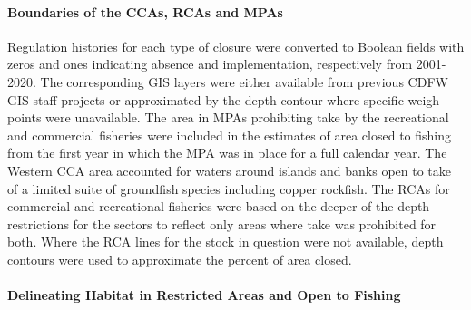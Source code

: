 \documentclass[11pt,
  english,
  a4paper,
]{article}
\begin{document}
\leavevmode\tagmcend\tagstructend\par


\hypertarget{boundaries-of-the-ccas-rcas-and-mpas}{%
\paragraph{Boundaries of the CCAs, RCAs and MPAs}\label{boundaries-of-the-ccas-rcas-and-mpas}}

\leavevmode\tagmcend\tagstructend


Regulation histories for each type of closure were converted to Boolean fields with zeros and ones indicating absence and implementation, respectively from 2001-2020. The corresponding GIS layers were either available from previous CDFW GIS staff projects or approximated by the depth contour where specific weigh points were unavailable. The area in MPAs prohibiting take by the recreational and commercial fisheries were included in the estimates of area closed to fishing from the first year in which the MPA was in place for a full calendar year. The Western CCA area accounted for waters around islands and banks open to take of a limited suite of groundfish species including copper rockfish. The RCAs for commercial and recreational fisheries were based on the deeper of the depth restrictions for the sectors to reflect only areas where take was prohibited for both. Where the RCA lines for the stock in question were not available, depth contours were used to approximate the percent of area closed.

\leavevmode\tagmcend\tagstructend\par


\hypertarget{delineating-habitat-in-restricted-areas-and-open-to-fishing}{%
\paragraph{Delineating Habitat in Restricted Areas and Open to Fishing}\label{delineating-habitat-in-restricted-areas-and-open-to-fishing}}

\leavevmode\tagmcend\tagstructend

\end{document}

